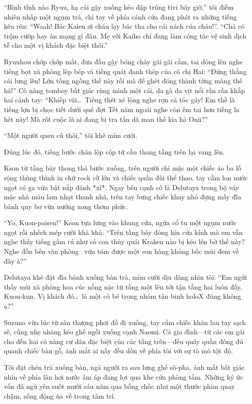 \documentclass[../main.tex]{subfiles}
\begin{document}
``Bình tĩnh nào Ryuu, hạ cái gậy xuống kẻo đập trúng tivi bây giờ,'' tôi điềm nhiên nhấp một ngụm trà, chỉ tay về phía cánh cửa đang phát ra những tiếng kêu rên: ``Waah! Bác Kaien ơi cháu lạy bác tha cho cái nách của cháu!''. ``Chả có trộm cướp hay án mạng gì đâu. Mẹ với Kaiho chỉ đang làm công tác vệ sinh dịch tễ cho một vị khách đặc biệt thôi.''

Ryuuhou chớp chớp mắt, đưa đầu gậy bóng chày gãi gãi cằm, tai dỏng lên nghe tiếng bọt xà phòng lép bép và tiếng quát đanh thép của cô chị Hai: ``Đứng thẳng cái lưng lên! Lớn tồng ngồng thế này rồi mà để ghét đóng thành từng mảng thế hả!'' Cô nàng tomboy bất giác rùng mình một cái, da gà da vịt nổi rần rần khắp hai cánh tay: ``Khiếp vãi\dots\ Tiếng thét xé lòng nghe rợn cả tóc gáy! Em thề là tiếng lợn bị chọc tiết dưới quê đợt Tết năm ngoái nghe còn êm tai hơn tiếng la hét này! Mà rốt cuộc là ai đang bị tra tấn dã man thế kia hả Onii?''

``Một người quen cũ thôi,'' tôi khẽ mỉm cười.

Đúng lúc đó, tiếng bước chân lộp cộp từ cầu thang tầng trên lại vang lên.

Kson từ tầng bảy thong thả bước xuống, trên người chỉ mặc một chiếc áo ba lỗ rộng thùng thình in chữ rock cỡ lớn và chiếc quần đùi thể thao, tay cầm lon nước ngọt có ga vừa bật nắp đánh *xì*. Ngay bên cạnh cô là Delutaya trong bộ váy mặc nhà màu lam nhạt thanh nhã, trên tay bưng chiếc khay nhỏ đựng mấy đĩa bánh quy bơ vừa nướng xong thơm phức.

``Yo, Kuon-paisen!'' Kson tựa lưng vào khung cửa, ngửa cổ tu một ngụm nước ngọt rồi nhếch mép cười khà khà: ``Trên tầng bảy đóng kín cửa kính mà em vẫn nghe thấy tiếng gầm rú như có con thủy quái Kraken nào bị kéo lên bờ thế này? Nghe đồn bên văn phòng \hll\ vừa tóm được một con hàng khủng bốc mùi đem về đây à?''

Delutaya khẽ đặt đĩa bánh xuống bàn trà, mỉm cười dịu dàng nhìn tôi: ``Em ngửi thấy mùi xà phòng hoa cúc nồng nặc từ tầng một lên tới tận tầng hai luôn đấy, Kuon-kun. Vị khách đó\dots\ là một cô bé trong nhóm tân binh holoX đúng không ạ?''

Suzuno vừa lúc từ sân thượng phơi đồ đi xuống, tay cầm chiếc khăn lau tay sạch sẽ, cũng nhẹ nhàng kéo ghế ngồi xuống cạnh Naomi. Cả gia đình—từ các em gái cho đến hai cô nàng cư dân đặc biệt của các tầng trên—đều quây quần đông đủ quanh chiếc bàn gỗ, ánh mắt ai nấy đều dồn về phía tôi với sự tò mò tột độ.

Tôi đặt chén trà xuống bàn, ngả người ra sau lưng ghế sô-pha, ánh mắt bất giác nhìn về phía làn hơi nước ấm áp đang lọt qua khe cửa phòng tắm. Những ký ức vốn đã ngủ yên suốt mười sáu năm qua bỗng chốc như một thước phim quay chậm, sống động ùa về trong tâm trí.
\end{document}
